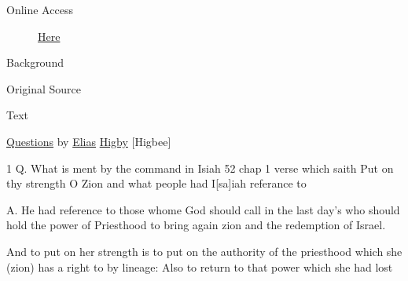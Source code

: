 				\begin{description}
					\item[Online Access] \href{https://www.josephsmithpapers.org/paper-summary/questions-and-answers-between-circa-16-and-circa-29-march-1838-b-dc-1137-10/1}{Here}
				\end{description}
				
				\begin{description}
					\item[Background]
				\end{description}
				
				
				\begin{description}
					\item[Original Source]
				\end{description}
				
				
				\begin{description}
					\item[Text]
				\end{description}
				
					\uline{Questions} by \uline{Elias} \uline{Higby} [Higbee]

					1 Q. What is ment by the command in Isiah 52\supers{.} chap 1 verse which saith Put on thy strength O Zion and what people had I[sa]iah referance to

					A. He had reference to those whome God should call in the last day's who should hold the power of Priesthood to bring again zion and the redemption of Israel.

					And to put on her strength is to put on the authority of the priesthood which she (zion) has a right to by lineage: Also to return to that power which she had lost

